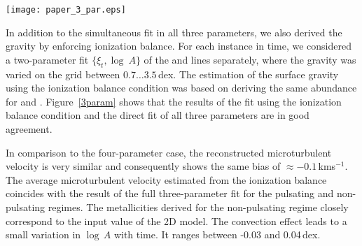\documentclass{aa}
\newcommand{\kmos}{kms$^{-1}$}
\begin{document}
\begin{figure*}
\centering
\texttt{[image: paper\_3\_par.eps]}
\caption{Result of the three-parameter fitting for the pulsating (left
  panel) and non-pulsating (right panel) regimes. The parameters of 
  the 2D model are shown by  orange  lines for both regimes. 
  The reconstructed parameters with the direct three-parameter
  fitting using the 1D LHD grid  are shown by blue lines.
  Results using the ionization
  balance are shown by green, brown, and solid black lines.  For the pulsating
  regime, the result of the experiment with a gravity limit for the maximum
  compression phase is shown by the dashed black line.   The relative RMS deviation
  $\sqrt{\chi^2}$ in line strengths between the 2D  and 1D models is shown 
  by the solid blue and black lines for the direct three-parameter fitting and 
  for a fitting using the ionization balance condition, respectively. 
}
\label{3param}
\end{figure*} 

   
In addition to the simultaneous fit in all three parameters, we also derived the
gravity by enforcing ionization balance.  For each instance in time, we
considered a two-parameter fit $\{\xi_t, \log \ A \}$ of the  and
 lines separately, where the gravity was varied on the grid between
$0.7\ldots 3.5$\,dex.  The estimation of the surface gravity using  
the ionization balance condition was based on deriving the same 
abundance for  and .
Figure~\ref{3param} shows that the results of the fit using the 
ionization balance condition and the direct fit of all three parameters 
are in good agreement.

In comparison to the four-parameter case, the reconstructed microturbulent
velocity is very similar and consequently shows the same bias of
$\approx-0.1$\,\kmos.  The average microturbulent velocity estimated from the
ionization balance coincides with the result of the full three-parameter fit
for the pulsating and non-pulsating regimes.  The metallicities derived for
the non-pulsating regime closely correspond to the input value of the 2D
model. The convection effect leads to a small variation in $\log\,A$ with
time. It ranges between -0.03 and 0.04\,dex.
\end{document}
